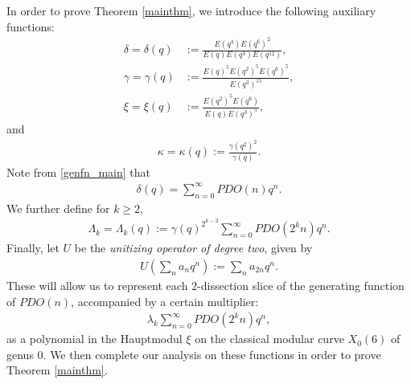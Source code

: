 \documentclass[12pt,reqno]{amsart}
\numberwithin{equation}{section}
\theoremstyle{theorem}
\theoremstyle{definition}
\begin{document}
In order to prove Theorem \ref{mainthm}, we introduce the following auxiliary functions:
\begin{align*}
	\delta=\delta(q)&:=\frac{E(q^4) E(q^6)^2}{E(q) E(q^3) E(q^{12})}, \\ %
	\gamma=\gamma(q)&:= \frac{E(q)^5 E(q^2)^5 E(q^6)^5}{E(q^3)^{15}}, \\ %
	\xi=\xi(q)&:=\frac{E(q^2)^5 E(q^6)}{E(q) E(q^3)^5}, %
\end{align*}
and
\begin{align*} %
	\kappa=\kappa(q):=\frac{\gamma(q^2)^2}{\gamma(q)}.
\end{align*}
Note from \eqref{genfn_main} that
\begin{align*}
	\delta(q) = \sum_{n=0}^\infty PDO(n)q^n.
\end{align*}
We further define for $k\ge 2$,
\begin{align}\label{eq:def-L}
	\Lambda_k = \Lambda_k(q):=\gamma(q)^{2^{k-2}}\sum_{n=0}^\infty PDO(2^{k} n)q^n.
\end{align}
Finally, let $U$ be the \emph{unitizing operator of degree two}, given by
\begin{align*}
	U\left(\sum_n a_n q^n\right):= \sum_n a_{2n} q^n.
\end{align*}
These will allow us to represent each $2$-dissection slice of the generating function of $PDO(n)$, accompanied by a certain multiplier:
\begin{align*}
    \lambda_k \sum_{n=0}^\infty PDO(2^k n)q^n,
\end{align*}
as a polynomial in the Hauptmodul $\xi$ on the classical modular curve $X_0(6)$ of genus $0$. We then complete our analysis on these functions in order to prove Theorem \ref{mainthm}.  
\end{document}
